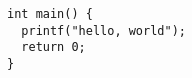 \documentclass{article}
\begin{document}
\begin{verbatim}
int main() {
  printf("hello, world");
  return 0;
}
\end{verbatim}
\end{document}
